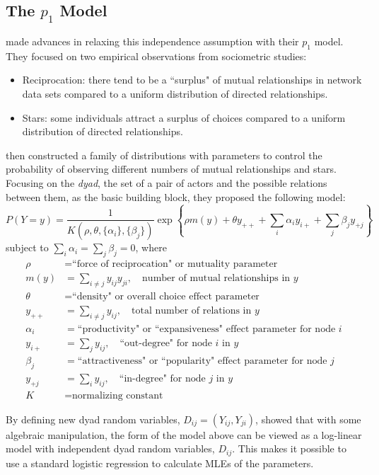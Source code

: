 \subsection{The $p_1$ Model} \label{S:p1}
\citet{Holland:1981} made advances in relaxing this independence assumption  with 
their $p_1$ model.  They focused on two empirical observations from sociometric 
studies:
\begin{itemize}
\item Reciprocation: there tend to be a ``surplus" of mutual relationships in network 
data sets compared to a uniform distribution of directed relationships.
\item Stars: some individuals attract a surplus of choices compared to a uniform 
distribution of directed relationships.
\end{itemize}
\citeauthor{Holland:1981} then constructed a family of distributions with parameters 
to control the probability of observing different numbers of mutual relationships and 
stars.  
Focusing on the \textit{dyad}, the set of a pair of actors and the possible relations 
between them, as the basic building block, they proposed the following model:
\[
	P( Y = y ) = \frac{1}{ K( \rho, \theta, \{ \alpha_i \}, \{\beta_j \} )}\exp \left 
\{  \rho m(y) + \theta y_{++} + \sum_i \alpha_i y_{i+} +  \sum_j \beta_j y_{+j}\right 
\}
\]
subject to $\sum_i \alpha_i = \sum_j \beta_j = 0$, where
\begin{align*}
	\rho &= \text{``force of reciprocation" or mutuality parameter}\\
	m(y) &= \sum_{i \neq j} y_{ij}y_{ji}, \quad \text{number of mutual relationships 
in $y$}\\
	\theta &= \text{``density" or overall choice effect parameter}\\
	y_{++} &= \sum_{i \neq j} y_{ij}, \quad  \text{total number of relations in $y$}\\
	\alpha_i &= \text{``productivity" or ``expansiveness" effect parameter for node $i
$}\\
	y_{i+} &= \sum_{j} y_{ij}, \quad  \text{``out-degree" for node $i$ in $y$}\\
	\beta_j &= \text{``attractiveness" or ``popularity" effect parameter for node $j$} 
\\
	y_{+j} &= \sum_{i} y_{ij}, \quad  \text{``in-degree" for node $j$ in $y$}\\
	K &= \text{normalizing constant}
\end{align*}

By defining new dyad random variables, $D_{ij} = (Y_{ij}, Y_{ji} )$, \citeauthor
{Holland:1981}  showed that with some algebraic manipulation, the form of the model above 
can be viewed as a log-linear model with independent dyad random variables, 
$D_{ij}$.  This makes it possible to use a standard logistic regression to calculate MLEs of the parameters.

